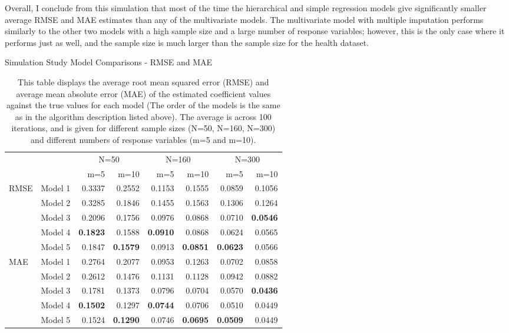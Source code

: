 Overall, I conclude from this simulation that most of the time the hierarchical and simple regression models give significantly smaller average RMSE and MAE estimates than any of the multivariate models. The multivariate model with multiple imputation performs similarly to the other two models with a high sample size and a large number of response variables; however, this is the only case where it performs just as well, and the sample size is much larger than the sample size for the health dataset.

\begin{table}[htb]
\renewcommand\thetable{2.1}
       \footnotesize
    \centering
        \caption{Simulation Study Model Comparisons - RMSE and MAE}
    \begin{tabular}{l|l|r|r|r|r|r|r}
    & & \multicolumn{2}{c}{N=50} & \multicolumn{2}{c}{N=160} & \multicolumn{2}{c}{N=300} \\
     & & m=5 & m=10 & m=5 & m=10 & m=5 & m=10 \\
    \hline
    \hline
    RMSE & Model 1 & 0.3337 & 0.2552 & 0.1153 & 0.1555 & 0.0859 & 0.1056  \\
      & Model 2 & 0.3285 & 0.1846 & 0.1455 & 0.1563 & 0.1306 & 0.1264  \\ 
      & Model 3 & 0.2096 & 0.1756 & 0.0976 & 0.0868 & 0.0710 & \textbf{0.0546} \\
      & Model 4 & \textbf{0.1823} & 0.1588 & \textbf{0.0910} & 0.0868 & 0.0624 & 0.0565  \\
      & Model 5 & 0.1847 & \textbf{0.1579} & 0.0913 & \textbf{0.0851} & \textbf{0.0623} & 0.0566  \\  
      \hline
    MAE & Model 1 & 0.2764 & 0.2077 & 0.0953 & 0.1263 & 0.0702 & 0.0858 \\
      & Model 2 & 0.2612 & 0.1476 & 0.1131 & 0.1128 & 0.0942 & 0.0882 \\
       & Model 3 & 0.1781 & 0.1373 & 0.0796 & 0.0704 & 0.0570 & \textbf{0.0436} \\
              & Model 4 & \textbf{0.1502} & 0.1297 & \textbf{0.0744} & 0.0706 & 0.0510 & 0.0449 \\
      & Model 5 & 0.1524 & \textbf{0.1290} & 0.0746 & \textbf{0.0695} & \textbf{0.0509} & 0.0449 \\
    \end{tabular}
    \label{symcomp}
    \caption{This table displays the average root mean squared error (RMSE) and average mean absolute error (MAE) of the estimated coefficient values against the true values for each model (The order of the models is the same as in the algorithm description listed above). The average is across 100 iterations, and is given for different sample sizes (N=50, N=160, N=300) and different numbers of response variables (m=5 and m=10).}
\end{table}

